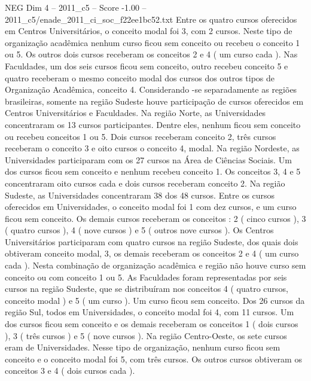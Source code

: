 \begin{textsample}{NEG Dim 4 – 2011\_c5 – Score -1.00 – 2011\_c5/enade\_2011\_ci\_soc\_f22ee1bc52.txt}
Entre os quatro cursos oferecidos em Centros Universitários, o conceito modal foi 3, com 2 cursos.
Neste tipo de organização acadêmica nenhum curso ficou sem conceito ou recebeu o conceito 1 ou 5.
Os outros dois cursos receberam os conceitos 2 e 4 ( um curso cada ).
Nas Faculdades, um dos seis cursos ficou sem conceito, outro recebeu conceito 5 e quatro receberam o mesmo conceito modal dos cursos dos outros tipos de Organização Acadêmica, conceito 4.
Considerando -se separadamente as regiões brasileiras, somente na região Sudeste houve participação de cursos oferecidos em Centros Universitários e Faculdades.
Na região Norte, as Universidades concentraram os 13 cursos participantes.
Dentre eles, nenhum ficou sem conceito ou recebeu conceitos 1 ou 5.
Dois cursos receberam conceito 2, três cursos receberam o conceito 3 e oito cursos o conceito 4, modal.
Na região Nordeste, as Universidades participaram com os 27 cursos na Área de Ciências Sociais.
Um dos cursos ficou sem conceito e nenhum recebeu conceito 1.
Os conceitos 3, 4 e 5 concentraram oito cursos cada e dois cursos receberam conceito 2.
Na região Sudeste, as Universidades concentraram 38 dos 48 cursos.
Entre os cursos oferecidos em Universidades, o conceito modal foi 1 com dez cursos, e um curso ficou sem conceito.
Os demais cursos receberam os conceitos : 2 ( cinco cursos ), 3 ( quatro cursos ), 4 ( nove cursos ) e 5 ( outros nove cursos ).
Os Centros Universitários participaram com quatro cursos na região Sudeste, dos quais dois obtiveram conceito modal, 3, os demais receberam os conceitos 2 e 4 ( um curso cada ).
Nesta combinação de organização acadêmica e região não houve curso sem conceito ou com conceito 1 ou 5.
As Faculdades foram representadas por seis cursos na região Sudeste, que se distribuíram nos conceitos 4 ( quatro cursos, conceito modal ) e 5 ( um curso ).
Um curso ficou sem conceito.
Dos 26 cursos da região Sul, todos em Universidades, o conceito modal foi 4, com 11 cursos.
Um dos cursos ficou sem conceito e os demais receberam os conceitos 1 ( dois cursos ), 3 ( três cursos ) e 5 ( nove cursos ).
Na região Centro-Oeste, os sete cursos eram de Universidades.
Nesse tipo de organização, nenhum curso ficou sem conceito e o conceito modal foi 5, com três cursos.
Os outros cursos obtiveram os conceitos 3 e 4 ( dois cursos cada ).

\end{textsample}
